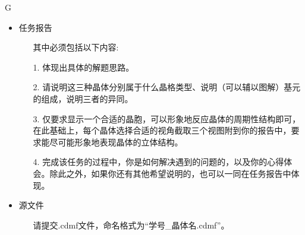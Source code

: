 \documentclass[12pt,a4paper]{article}
\begin{document}
\clearpage
{}
\begin{ACEEsubmit}{G}
	\begin{itemize}
		\item 任务报告
		\begin{itemize}
			\item[] 其中必须包括以下内容:
			\item[1.] 体现出具体的解题思路。
			\item[2.] 请说明这三种晶体分别属于什么晶格类型、说明（可以辅以图解）基元的组成，说明三者的异同。
			\item[3.] 仅要求显示一个合适的晶胞，可以形象地反应晶体的周期性结构即可，在此基础上，每个晶体选择合适的视角截取三个视图附到你的报告中，要求能尽可能形象地表现晶体的立体结构。
			\item[4.] 完成该任务的过程中，你是如何解决遇到的问题的，以及你的心得体会。除此之外，如果你还有其他希望说明的，也可以一同在任务报告中体现。
		\end{itemize}	
		\item 源文件
		\begin{itemize}
			\item[] 请提交.cdmf文件，命名格式为``学号\_晶体名.cdmf''。
		\end{itemize}
	\end{itemize}
\end{ACEEsubmit}
\end{document}
